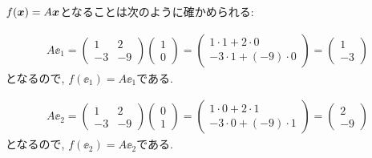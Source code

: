 \begin{checkanswer}%
  $f(\boldsymbol{x})=A\boldsymbol{x}$となることは次のように確かめられる:

  \begin{align*}
    A\ee_1=
    \begin{pmatrix}1&2\\-3&-9\end{pmatrix}\begin{pmatrix}1\\0\end{pmatrix}
    =\begin{pmatrix}1\cdot 1+2\cdot 0\\-3\cdot 1+(-9)\cdot 0\end{pmatrix}
    =\begin{pmatrix}1\\-3\end{pmatrix}
  \end{align*}
  となるので, $f(\ee_1)=A\ee_1$である.

  \begin{align*}
    A\ee_2=
    \begin{pmatrix}1&2\\-3&-9\end{pmatrix}\begin{pmatrix}0\\1\end{pmatrix}
    =\begin{pmatrix}1\cdot 0+2\cdot 1\\-3\cdot 0+(-9)\cdot 1\end{pmatrix}
    =\begin{pmatrix}2\\-9\end{pmatrix}
  \end{align*}
  となるので, $f(\ee_2)=A\ee_2$である.
\end{checkanswer}

